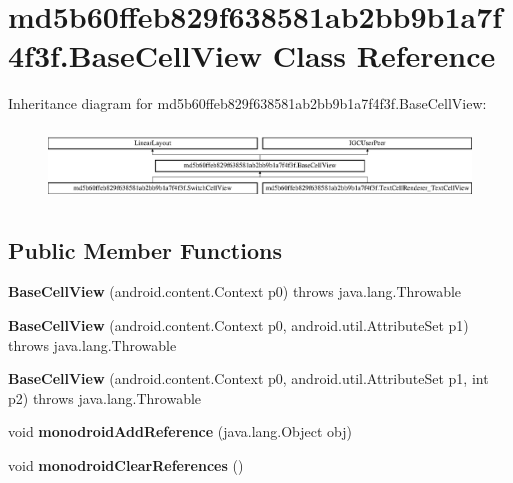 \hypertarget{classmd5b60ffeb829f638581ab2bb9b1a7f4f3f_1_1BaseCellView}{}\section{md5b60ffeb829f638581ab2bb9b1a7f4f3f.\+Base\+Cell\+View Class Reference}
\label{classmd5b60ffeb829f638581ab2bb9b1a7f4f3f_1_1BaseCellView}
Inheritance diagram for md5b60ffeb829f638581ab2bb9b1a7f4f3f.\+Base\+Cell\+View\+:\begin{figure}[H]
\begin{center}
\leavevmode
\includegraphics[height=1.948956cm]{classmd5b60ffeb829f638581ab2bb9b1a7f4f3f_1_1BaseCellView}
\end{center}
\end{figure}
\subsection*{Public Member Functions}
\begin{DoxyCompactItemize}
\item 
\mbox{\label{classmd5b60ffeb829f638581ab2bb9b1a7f4f3f_1_1BaseCellView_a7bbdf44f1151ae9c2fbf5be34398aba5}} 
{\bfseries Base\+Cell\+View} (android.\+content.\+Context p0)  throws java.\+lang.\+Throwable 	
\item 
\mbox{\label{classmd5b60ffeb829f638581ab2bb9b1a7f4f3f_1_1BaseCellView_a8c64775ade9cdc20316e9b64a710eb0f}} 
{\bfseries Base\+Cell\+View} (android.\+content.\+Context p0, android.\+util.\+Attribute\+Set p1)  throws java.\+lang.\+Throwable 	
\item 
\mbox{\label{classmd5b60ffeb829f638581ab2bb9b1a7f4f3f_1_1BaseCellView_afad241accb4e748807ae00d69c3fc2c3}} 
{\bfseries Base\+Cell\+View} (android.\+content.\+Context p0, android.\+util.\+Attribute\+Set p1, int p2)  throws java.\+lang.\+Throwable 	
\item 
\mbox{\label{classmd5b60ffeb829f638581ab2bb9b1a7f4f3f_1_1BaseCellView_a7064411ae8713f07abf9855828ab5d7a}} 
void {\bfseries monodroid\+Add\+Reference} (java.\+lang.\+Object obj)
\item 
\mbox{\label{classmd5b60ffeb829f638581ab2bb9b1a7f4f3f_1_1BaseCellView_abd00d7bfaf56776cb2df98366ee775d7}} 
void {\bfseries monodroid\+Clear\+References} ()
\end{DoxyCompactItemize}

